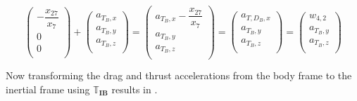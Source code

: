 \begin{equation} \label{eq:DandTBody}
\begin{pmatrix}
-\dfrac{x_{27}}{x_{7}}\\
0\\
0\\
\end{pmatrix}
+
\begin{pmatrix}
a_{T_{B},x}\\
a_{T_{B},y}\\
a_{T_{B},z}\\
\end{pmatrix}
=
\begin{pmatrix}
a_{T_{B},x}-\dfrac{x_{27}}{x_{7}}\\
a_{T_{B},y}\\
a_{T_{B},z}\\
\end{pmatrix}
=
\begin{pmatrix}
a_{T,D_{B},x}\\
a_{T_{B},y}\\
a_{T_{B},z}\\
\end{pmatrix}
=
\begin{pmatrix}
w_{4,2}\\
a_{T_{B},y}\\
a_{T_{B},z}\\
\end{pmatrix}
\end{equation}

Now transforming the drag and thrust accelerations from the body frame to the inertial frame using $\mathbb{T}_{\mathbf{IB}}$ results in .


